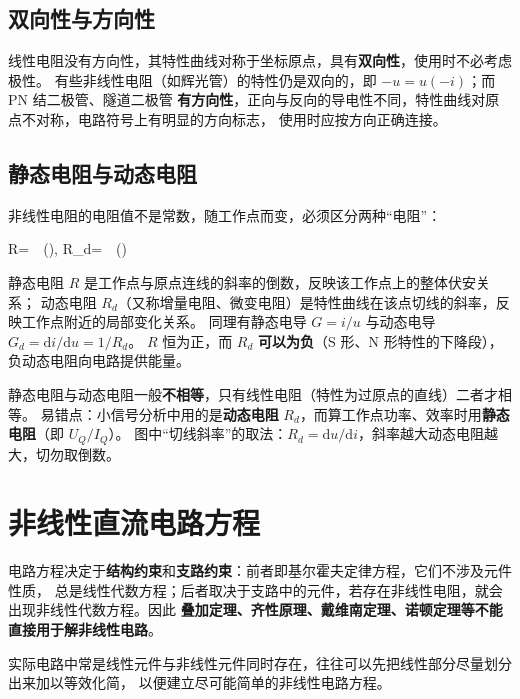 \subsection{双向性与方向性}
线性电阻没有方向性，其特性曲线对称于坐标原点，具有\textbf{双向性}，使用时不必考虑极性。
有些非线性电阻（如辉光管）的特性仍是双向的，即 $-u=u(-i)$；而 PN 结二极管、隧道二极管
\textbf{有方向性}，正向与反向的导电性不同，特性曲线对原点不对称，电路符号上有明显的方向标志，
使用时应按方向正确连接。

\subsection{静态电阻与动态电阻}
非线性电阻的电阻值不是常数，随工作点而变，必须区分两种“电阻”：
\begin{keyformula}{R=\ \ (),\qquad
  R_d=\ \ ()}
\end{keyformula}
静态电阻 $R$ 是工作点与原点连线的斜率的倒数，反映该工作点上的整体伏安关系；
动态电阻 $R_d$（又称增量电阻、微变电阻）是特性曲线在该点切线的斜率，反映工作点附近的局部变化关系。
同理有静态电导 $G=i/u$ 与动态电导 $G_d=\mathrm{d}i/\mathrm{d}u=1/R_d$。
$R$ 恒为正，而 $R_d$ \textbf{可以为负}（S 形、N 形特性的下降段），负动态电阻向电路提供能量。

\begin{corepoint}{静态电阻与动态电阻一般\textbf{不相等}，只有线性电阻（特性为过原点的直线）二者才相等。
易错点：小信号分析中用的是\textbf{动态电阻} $R_d$，而算工作点功率、效率时用\textbf{静态电阻}（即 $U_Q/I_Q$）。
图中“切线斜率”的取法：$R_d=\mathrm{d}u/\mathrm{d}i$，斜率越大动态电阻越大，切勿取倒数。}
\end{corepoint}

\section{非线性直流电路方程}

电路方程决定于\textbf{结构约束}和\textbf{支路约束}：前者即基尔霍夫定律方程，它们不涉及元件性质，
总是线性代数方程；后者取决于支路中的元件，若存在非线性电阻，就会出现非线性代数方程。因此
\textbf{叠加定理、齐性原理、戴维南定理、诺顿定理等不能直接用于解非线性电路}。

实际电路中常是线性元件与非线性元件同时存在，往往可以先把线性部分尽量划分出来加以等效化简，
以便建立尽可能简单的非线性电路方程。

